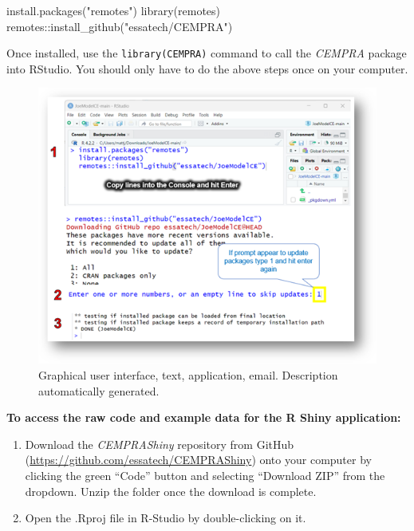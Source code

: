 \documentclass[
  letterpaper,
  DIV=11,
  numbers=noendperiod]{scrreprt}
\newenvironment{Shaded}{\begin{snugshade}}{\end{snugshade}}
\newcommand{\FunctionTok}[1]{\textcolor[rgb]{0.28,0.35,0.67}{#1}}
\newcommand{\NormalTok}[1]{\textcolor[rgb]{0.00,0.23,0.31}{#1}}
\newcommand{\SpecialCharTok}[1]{\textcolor[rgb]{0.37,0.37,0.37}{#1}}
\newcommand{\StringTok}[1]{\textcolor[rgb]{0.13,0.47,0.30}{#1}}
\begin{document}
\begin{Shaded}
\begin{Highlighting}[]
\FunctionTok{install.packages}\NormalTok{(}\StringTok{"remotes"}\NormalTok{)}
\FunctionTok{library}\NormalTok{(remotes)}
\NormalTok{remotes}\SpecialCharTok{::}\FunctionTok{install\_github}\NormalTok{(}\StringTok{"essatech/CEMPRA"}\NormalTok{)}
\end{Highlighting}
\end{Shaded}

Once installed, use the \texttt{library(CEMPRA)} command to call the
\emph{CEMPRA} package into RStudio. You should only have to do the above
steps once on your computer.

\begin{figure}

{\centering \includegraphics{images/image015.png}

}

\caption{Graphical user interface, text, application, email. Description
automatically generated.}

\end{figure}

\textbf{To access the raw code and example data for the R Shiny
application:}

\begin{enumerate}
\def\labelenumi{\arabic{enumi}.}
\item
  Download the \emph{CEMPRAShiny} repository from GitHub
  (\url{https://github.com/essatech/CEMPRAShiny}) onto your computer by
  clicking the green ``Code'' button and selecting ``Download ZIP'' from
  the dropdown. Unzip the folder once the download is complete.
\item
  Open the .Rproj file in R-Studio by double-clicking on it.
\end{enumerate}
\end{document}
